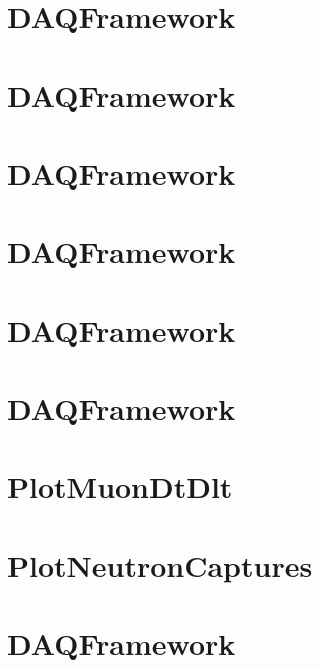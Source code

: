 \let\mypdfximage\pdfximage\def\pdfximage{\immediate\mypdfximage}\documentclass[twoside]{book}
\newcommand{\+}{\discretionary{\mbox{\scriptsize$\hookleftarrow$}}{}{}}
\begin{document}
\chapter{DAQFramework}
\label{md_UserTools_muechk_README}

\chapter{DAQFramework}
\label{md_UserTools_mufit_sk4_README}

\chapter{DAQFramework}
\label{md_UserTools_NCaptInfo_README}

\chapter{DAQFramework}
\label{md_UserTools_NeutCloudCorrelationCuts_README}

\chapter{DAQFramework}
\label{md_UserTools_ntag_BDT_README}

\chapter{DAQFramework}
\label{md_UserTools_PlotHitTimes_README}

\chapter{Plot\+Muon\+Dt\+Dlt}
\label{md_UserTools_PlotMuonDtDlt_README}

\chapter{Plot\+Neutron\+Captures}
\label{md_UserTools_PlotNeutronCaptures_README}

\chapter{DAQFramework}
\label{md_UserTools_PositronIdentificationCuts_README}

\end{document}

